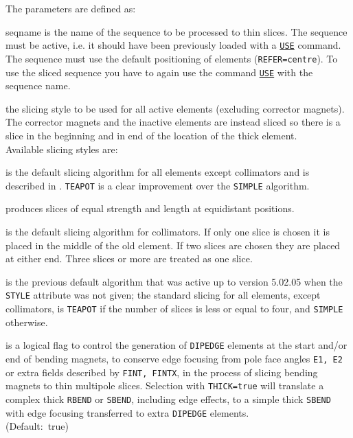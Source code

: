 The parameters are defined as: 
\begin{madlist}
    seqname is the name of the sequence to be
   processed to thin slices. The sequence must be active, i.e. it should
   have been previously loaded with a \hyperref[sec:use]{\texttt{USE}} command.  
   The sequence must use the default positioning of elements
   ({\texttt{REFER=centre}}). To use the sliced sequence you have to again use the command
   \hyperref[sec:use]{\texttt{USE}} with the sequence name. 

    the slicing style to be used for all active elements (excluding corrector magnets).
   The corrector magnets and the inactive elements are instead sliced so there is a slice in the 
   beginning and in end of the location of the thick element.  \\
   Available slicing styles are: 

   \begin{madlist}
   	 is the default slicing algorithm for all elements 
   	except collimators and is described in \cite{burkhardt2013}. 
   	\texttt{TEAPOT} is a clear improvement over the \texttt{SIMPLE} algorithm.
   	
   	 produces slices of equal strength and length at equidistant
   	positions.
   	
   	 is the default slicing algorithm for collimators. 
   	If only one slice is chosen it is placed in the middle of the old
   	element. If two slices are chosen they are placed at either
   	end. Three slices or more are treated as one slice. 
   	
   	 is the previous default algorithm 
   	that was active up to version 5.02.05 when the \texttt{STYLE} 
   	attribute was not given; the standard slicing for all
   	elements, except collimators, is \texttt{TEAPOT} if the number
   	of slices is less or equal to four, and \texttt{SIMPLE} otherwise.
   
   \end{madlist}
   
    is a logical flag to control the generation of
   \texttt{DIPEDGE} elements at the start and/or end of bending magnets,
   to conserve edge focusing from pole face angles \texttt{E1, E2}
   or extra fields described by \texttt{FINT, FINTX}, in the
   process of slicing bending magnets to thin multipole slices.   
   Selection with \texttt{THICK=true} will translate a complex thick 
   \texttt{RBEND} or \texttt{SBEND}, including edge effects, to a simple
   thick \texttt{SBEND} with edge focusing transferred to extra 
   \texttt{DIPEDGE} elements. \\ 
   (Default:~true)
\end{madlist}

